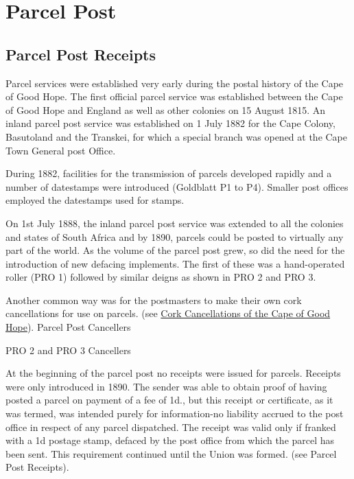 \section{Parcel Post} 	 
\subsection{Parcel Post Receipts} 


Parcel services were established very early during the 
postal history of the Cape of Good Hope. The first official 
parcel service was established between the Cape of Good Hope 
and England as well as other colonies on 15 August 1815. 
An inland parcel post service was established on 1 July 1882 
for the Cape Colony, Basutoland and the Transkei, for which 
a special branch was opened at the Cape Town General post Office.


During 1882, facilities for the transmission of parcels developed 
rapidly and a number of datestamps were introduced (Goldblatt P1 to P4). 
Smaller post offices employed the datestamps used for stamps.


On 1st July 1888, the inland parcel post service was extended to all the colonies and states of South Africa and by 1890, parcels could be posted to virtually any part of the world.  As the volume of the parcel post grew, so did the need for the introduction of new defacing implements. The first of these was a hand-operated roller (PRO 1) followed by similar deigns as shown in PRO 2 and PRO 3.


Another common way was for the postmasters to make their own cork 
cancellations for use on parcels. (see  
\href{Parcel_Post_Cork_Cancellations}{Cork Cancellations of the Cape of Good Hope}).
Parcel Post Cancellers

PRO 2 and PRO 3 Cancellers

At the beginning of the parcel post no receipts were 
issued for parcels. Receipts were only introduced in 1890. The 
sender was able to obtain proof of having posted a parcel on 
payment of a fee of 1d., but this receipt or certificate, as it 
was termed, was intended purely for information-no liability 
accrued to the post office in respect of any parcel dispatched. 
The receipt was valid only if franked with a 1d postage stamp, 
defaced by the post office from which the parcel has been sent. 
This requirement continued until the Union was formed. 
(see Parcel Post Receipts).



 

 

 

 

 

       